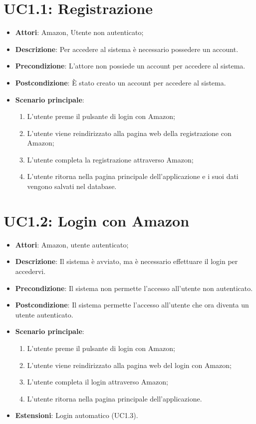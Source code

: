 \section{UC1.1: Registrazione}
\label{UC1.1}
\begin{itemize}
	\item \textbf{Attori}: Amazon, Utente non autenticato;
	\item \textbf{Descrizione}: Per accedere al sistema è necessario possedere un account.
	\item \textbf{Precondizione}: L'attore non possiede un account per accedere al sistema.
	\item \textbf{Postcondizione}: \`{E} stato creato un account per accedere al sistema.
	\item \textbf{Scenario principale}:
	\begin{enumerate} \item L'utente preme il pulsante di login con Amazon;  \item  L'utente viene reindirizzato alla pagina web della registrazione con Amazon;  \item L'utente completa la registrazione attraverso Amazon;  \item  L'utente ritorna nella pagina principale dell'applicazione e i suoi dati vengono salvati nel database.\end{enumerate}
\end{itemize}

\section{UC1.2: Login con Amazon}
\label{UC1.2}
\begin{itemize}
	\item \textbf{Attori}: Amazon, utente autenticato;
	\item \textbf{Descrizione}: Il sistema è avviato, ma è necessario effettuare il login per accedervi.
	\item \textbf{Precondizione}: Il sistema non permette l'accesso all'utente non autenticato.
	\item \textbf{Postcondizione}: Il sistema permette l'accesso all'utente che ora diventa un utente autenticato.
	\item \textbf{Scenario principale}:
	\begin{enumerate} \item L'utente preme il pulsante di login con Amazon;  \item  L'utente viene reindirizzato alla pagina web del login con Amazon;  \item L'utente completa il login attraverso Amazon;  \item  L'utente ritorna nella pagina principale dell'applicazione.\end{enumerate}
	\item \textbf{Estensioni}:
	Login automatico (UC1.3).
\end{itemize}

